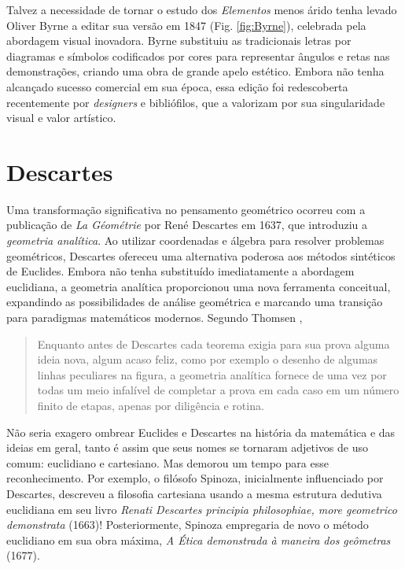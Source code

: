 \documentclass{hipatia}
\begin{document}
Talvez a necessidade de tornar o estudo dos 
\emph{Elementos} menos árido tenha levado
Oliver Byrne a editar sua versão em 1847 (Fig. \ref{fig:Byrne}), 
celebrada pela abordagem visual inovadora. Byrne
substituiu as tradicionais letras por diagramas e símbolos
codificados por cores para representar ângulos e retas nas
demonstrações, criando uma obra de grande apelo estético. Embora
não tenha alcançado sucesso comercial em sua época, essa
edição foi redescoberta recentemente por \emph{designers} e
bibliófilos, que a valorizam por sua singularidade visual e
valor artístico.


\section{Descartes}

Uma transformação significativa no pensamento geo\-métrico
ocorreu com a publicação de \emph{La Géométrie} por René Descartes
em 1637, que introduziu a \emph{geometria analítica}.
Ao utilizar
coordenadas e álgebra para resolver problemas geométricos,
Descartes ofereceu uma alternativa poderosa aos métodos
sintéticos de Euclides. Embora não tenha substituído
imediatamente a abordagem euclidiana, a geometria analítica
proporcionou uma nova ferramenta conceitual, expandindo as
possibilidades de análise geométrica e marcando uma
transição para paradigmas matemáticos modernos.
Segundo Thomsen \cite{Thomsen33},
\begin{quote}
    Enquanto antes de Descartes cada teorema exigia 
		para sua prova alguma ideia nova, algum acaso feliz, 
		como por exemplo o desenho de algumas linhas 
		peculiares na figura, a geometria analítica 
		fornece de uma vez por todas um meio infalível 
		de completar a prova em cada caso em um número 
		finito de etapas, apenas por diligência e rotina.
\end{quote}

Não seria exagero ombrear Euclides e Descartes na
história da matemática e das ideias em geral, tanto
é assim que seus nomes se tornaram adjetivos
de uso comum: euclidiano e cartesiano. Mas 
demorou um tempo para esse reconhecimento. 
Por exemplo, o filósofo Spinoza, inicialmente
influenciado por Descartes, descreveu a 
filosofia cartesiana usando a mesma 
estrutura dedutiva euclidiana
em seu livro \emph{Renati Descartes principia philosophiae,
 more geometrico demonstrata} (1663)! Posteriormente,
 Spinoza empregaria de novo o método euclidiano em 
 sua obra máxima, \emph{A Ética demonstrada à
  maneira dos geômetras} (1677).
\end{document}
